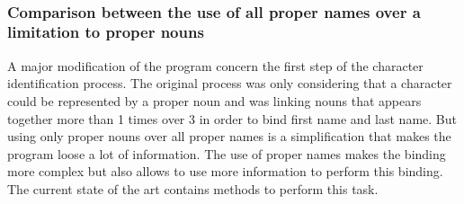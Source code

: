 \documentclass[a4paper, 12pt]{report}
\begin{document}
\begin{table}
\center
{}\\
\caption{Different type of characters appearance}\label{appearance_type}
\end{table}


\subsubsection{Comparison between the use of all proper names over a limitation to proper nouns}
A major modification of the program concern the first step of the character identification process. 
The original process was only considering that a character could be represented by a proper noun and was linking nouns that appears together more than 1 times over 3 
in order to bind first name and last name.
But using only proper nouns over all proper names is a simplification that makes the program loose a lot of information. 
The use of proper names makes the binding more complex but also allows to use more information to perform this binding. 
The current state of the art contains methods to perform this task. \\

\begin{table}
\center
{}\\
\caption{Different type of characters appearance}\label{properNounsNames}
\end{table}
\end{document}
